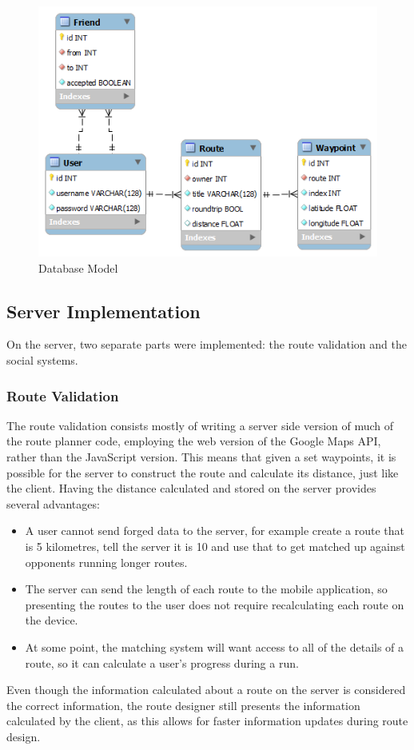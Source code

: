 \begin{figure}[!ht]
	\centering
	\includegraphics[scale=0.5]{img/sprint2db.png}
	\caption{Database Model}
	\label{fig:sprint2-db-model}
\end{figure}

\subsection{Server Implementation}
On the server, two separate parts were implemented: the route validation and the social systems.

\subsubsection{Route Validation}
The route validation consists mostly of writing a server side version of much of the route planner code, employing the web version of the Google Maps \ac{API}, rather than the JavaScript version. This means that given a set waypoints, it is possible for the server to construct the route and calculate its distance, just like the client. Having the distance calculated and stored on the server provides several advantages:
	\begin{itemize}
		\item{A user cannot send forged data to the server, for example create a route that is 5 kilometres, tell the server it is 10 and use that to get matched up against opponents running longer routes.}
		\item{The server can send the length of each route to the mobile application, so presenting the routes to the user does not require recalculating each route on the device.}
		\item{At some point, the matching system will want access to all of the details of a route, so it can calculate a user's progress during a run.}
	\end{itemize}
	Even though the information calculated about a route on the server is considered the correct information, the route designer still presents the information calculated by the client, as this allows for faster information updates during route design.
	
